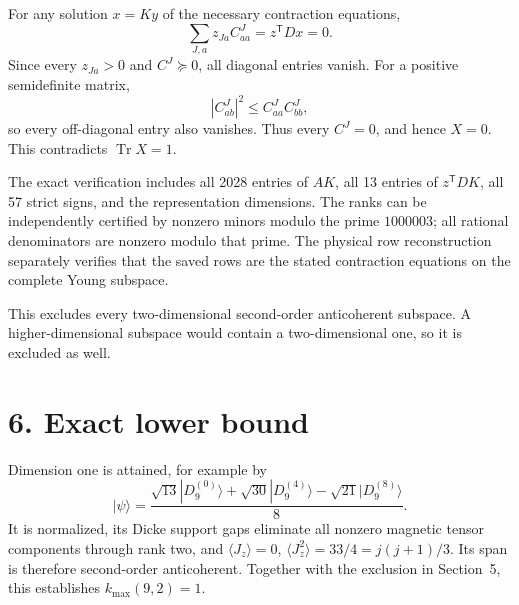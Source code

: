 \documentclass[11pt]{article}
\newcommand{\Tr}{\operatorname{Tr}}
\begin{document}
For any solution $x=Ky$ of the necessary contraction equations,
\[
 \sum_{J,a}z_{Ja}C^J_{aa}=z^{\mathsf T}Dx=0.
\]
Since every $z_{Ja}>0$ and $C^J\succeq0$, all diagonal entries vanish. For a positive semidefinite matrix,
\[
 |C^J_{ab}|^2\le C^J_{aa}C^J_{bb},
\]
so every off-diagonal entry also vanishes. Thus every $C^J=0$, and hence $X=0$. This contradicts $\Tr X=1$.

The exact verification includes all 2028 entries of $AK$, all 13 entries of $z^{\mathsf T}DK$, all 57 strict signs, and the representation dimensions. The ranks can be independently certified by nonzero minors modulo the prime $1000003$; all rational denominators are nonzero modulo that prime. The physical row reconstruction separately verifies that the saved rows are the stated contraction equations on the complete Young subspace.

This excludes every two-dimensional second-order anticoherent subspace. A higher-dimensional subspace would contain a two-dimensional one, so it is excluded as well.

\section*{6. Exact lower bound}
Dimension one is attained, for example by
\[
 |\psi\rangle=\frac{\sqrt{13}|D_9^{(0)}\rangle
                         +\sqrt{30}|D_9^{(4)}\rangle
                         -\sqrt{21}|D_9^{(8)}\rangle}{8}.
\]
It is normalized, its Dicke support gaps eliminate all nonzero magnetic tensor components through rank two, and
$\langle J_z\rangle=0$, $\langle J_z^2\rangle=33/4=j(j+1)/3$.
Its span is therefore second-order anticoherent. Together with the exclusion in Section~5, this establishes $k_{\max}(9,2)=1$.
\end{document}
